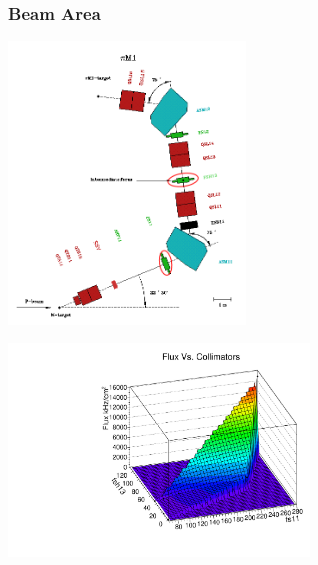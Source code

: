 \documentclass[9pt]{beamer}
\begin{document}
\begin{frame}
	\frametitle{Beam Area}
	\begin{center}
		\includegraphics[height=7.5cm]{pim1}
	\end{center}
\end{frame}
\begin{frame}
	\begin{center}
		\includegraphics[angle=270, width=8cm]{FluxVsCollimators}
	\end{center}
\end{frame}
\end{document}
